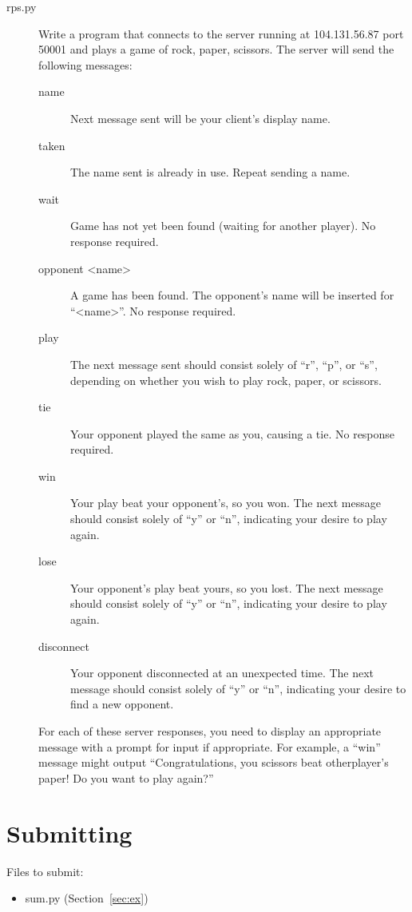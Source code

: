 \documentclass[11pt]{cselabheader}
\begin{document}
\begin{description}
\item[rps.py] Write a program that connects to the server running at 104.131.56.87
  port 50001 and plays a game of rock, paper, scissors. The server will send the
  following messages:
  \begin{description}
  \item[name] Next message sent will be your client's display name.
  \item[taken] The name sent is already in use. Repeat sending a name.
  \item[wait] Game has not yet been found (waiting for another player). No response
    required.
  \item[opponent <name>] A game has been found. The opponent's name will be inserted for ``<name>''. No response required.
  \item[play] The next message sent should consist solely of ``r'', ``p'', or ``s'', depending on whether you wish to play rock, paper, or scissors.
  \item[tie] Your opponent played the same as you, causing a tie. No response required.
  \item[win] Your play beat your opponent's, so you won. The next message should consist solely of ``y'' or ``n'', indicating your desire to play again.
  \item[lose] Your opponent's play beat yours, so you lost. The next message should consist solely of ``y'' or ``n'', indicating your desire to play again.
  \item[disconnect] Your opponent disconnected at an unexpected time. The next message should consist solely of ``y'' or ``n'', indicating your desire to find a new opponent.
  \end{description}

  For each of these server responses, you need to display an appropriate message with a prompt for input if appropriate. For example, a ``win'' message might output ``Congratulations, you scissors beat otherplayer's paper! Do you want to play again?''
\end{description}

\pagebreak
\section{Submitting}

Files to submit:
\begin{itemize}
  \item sum.py (Section~\ref{sec:ex})
\end{itemize}
\end{document}
